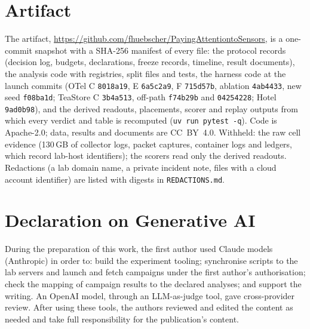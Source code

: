 \documentclass{ceurart}
\begin{document}
\section{Artifact}\label{sec:artifact}
The artifact, \url{https://github.com/fhuebscher/PayingAttentiontoSensors}, is a one-commit snapshot with a SHA-256 manifest of every file: the
protocol records (decision log, budgets, declarations, freeze records, timeline, result documents), the analysis code with
registries, split files and tests, the harness code at the launch commits (OTel C \texttt{8018a19}, E \texttt{6a5c2a9}, F
\texttt{715d57b}, ablation \texttt{4ab4433}, new seed \texttt{f08ba1d}; TeaStore C \texttt{3b4a513}, off-path \texttt{f74b29b}
and \texttt{04254228}; Hotel \texttt{9ad0b98}), and the derived readouts, placements, scorer and replay outputs from which
every verdict and table is recomputed (\texttt{uv run pytest -q}). Code is Apache-2.0; data, results and documents are
CC~BY~4.0. Withheld: the raw cell evidence (130\,GB of collector logs, packet captures, container logs and ledgers, which
record lab-host identifiers); the scorers read only the derived readouts. Redactions (a lab domain name, a private incident note,
files with a cloud account identifier) are listed with digests in \texttt{REDACTIONS.md}.

\section*{Declaration on Generative AI}
During the preparation of this work, the first author used Claude models (Anthropic) in order to: build the experiment tooling;
synchronise scripts to the lab servers and launch and fetch campaigns under the first author's authorisation; check the mapping of
campaign results to the declared analyses; and support the writing. An OpenAI model, through an LLM-as-judge tool, gave
cross-provider review. After using these tools, the authors reviewed and edited the content as needed and take full
responsibility for the publication's content.


\end{document}
